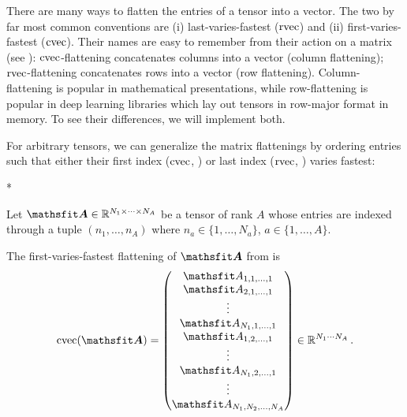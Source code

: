 There are many ways to flatten the entries of a tensor into a vector.
The two by far most common conventions are (i) last-varies-fastest ($\operatorname{rvec}$) and (ii) first-varies-fastest ($\operatorname{cvec}$).
Their names are easy to remember from their action on a matrix (see ): $\operatorname{cvec}$-flattening concatenates columns into a vector (column flattening); $\operatorname{rvec}$-flattening concatenates rows into a vector (row flattening).
Column-flattening is popular in mathematical presentations, while row-flattening is popular in deep learning libraries which lay out tensors in row-major format in memory.
To see their differences, we will implement both.

For arbitrary tensors, we can generalize the matrix flattenings by ordering entries such that either their first index ($\operatorname{cvec}$, ) or last index ($\operatorname{rvec}$, ) varies fastest:

\switchcolumn[1]*
\switchcolumn[0]

\begin{setup}\label{setup:flattening}
  Let $\tA \in \sR^{N_1 \times \dots \times N_A}$ be a tensor of rank $A$ whose entries are indexed through a tuple $(n_1, \dots, n_A)$ where $n_a \in \{1, \dots, N_a\}$, $a \in \{1, \dots, A\}$.
\end{setup}
\begin{definition}\label{def:cvec}
  The first-varies-fastest flattening of $\tA$ from  is
  \begin{align*}
    \cvec(\tA) =
    \begin{pmatrix}
      \etA_{1,1,\dots,1}   \\
      \etA_{2,1,\dots,1}   \\
      \vdots               \\
      \etA_{N_1,1,\dots,1} \\
      \etA_{1,2,\dots,1}   \\
      \vdots               \\
      \etA_{N_1,2,\dots,1} \\
      \vdots               \\
      \etA_{N_1,N_2,\dots,N_A}
    \end{pmatrix}
    \in \sR ^{N_1 \cdots N_A}\,.
  \end{align*}
\end{definition}

